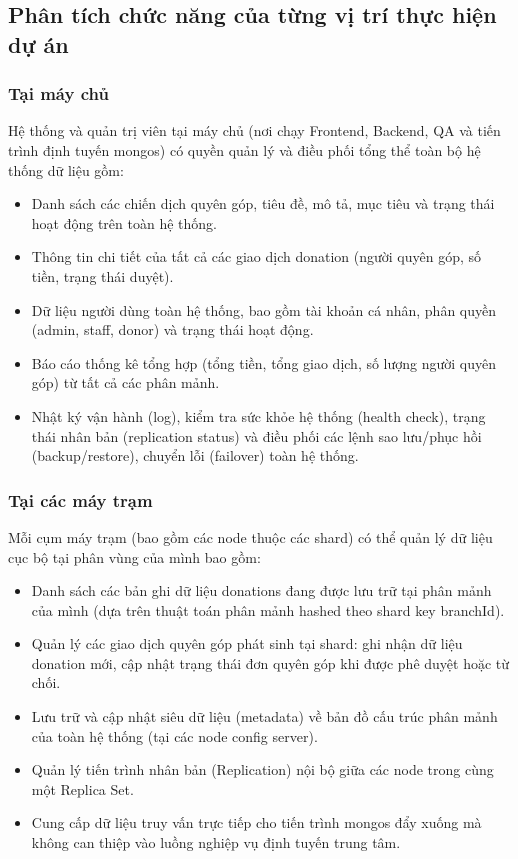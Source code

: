 \documentclass[12pt,a4paper]{article}
\begin{document}
\subsection{Phân tích chức năng của từng vị trí thực hiện dự án}

\subsubsection{Tại máy chủ}
Hệ thống và quản trị viên tại máy chủ (nơi chạy Frontend, Backend, QA và tiến trình định tuyến mongos) có quyền quản lý và điều phối tổng thể toàn bộ hệ thống dữ liệu gồm:
\begin{itemize}
    \item Danh sách các chiến dịch quyên góp, tiêu đề, mô tả, mục tiêu và trạng thái hoạt động trên toàn hệ thống.
    \item Thông tin chi tiết của tất cả các giao dịch donation (người quyên góp, số tiền, trạng thái duyệt).
    \item Dữ liệu người dùng toàn hệ thống, bao gồm tài khoản cá nhân, phân quyền (admin, staff, donor) và trạng thái hoạt động.
    \item Báo cáo thống kê tổng hợp (tổng tiền, tổng giao dịch, số lượng người quyên góp) từ tất cả các phân mảnh.
    \item Nhật ký vận hành (log), kiểm tra sức khỏe hệ thống (health check), trạng thái nhân bản (replication status) và điều phối các lệnh sao lưu/phục hồi (backup/restore), chuyển lỗi (failover) toàn hệ thống.
\end{itemize}

\subsubsection{Tại các máy trạm}
Mỗi cụm máy trạm (bao gồm các node thuộc các shard) có thể quản lý dữ liệu cục bộ tại phân vùng của mình bao gồm:
\begin{itemize}
    \item Danh sách các bản ghi dữ liệu donations đang được lưu trữ tại phân mảnh của mình (dựa trên thuật toán phân mảnh hashed theo shard key branchId).
    \item Quản lý các giao dịch quyên góp phát sinh tại shard: ghi nhận dữ liệu donation mới, cập nhật trạng thái đơn quyên góp khi được phê duyệt hoặc từ chối.
    \item Lưu trữ và cập nhật siêu dữ liệu (metadata) về bản đồ cấu trúc phân mảnh của toàn hệ thống (tại các node config server).
    \item Quản lý tiến trình nhân bản (Replication) nội bộ giữa các node trong cùng một Replica Set.
    \item Cung cấp dữ liệu truy vấn trực tiếp cho tiến trình mongos đẩy xuống mà không can thiệp vào luồng nghiệp vụ định tuyến trung tâm.
\end{itemize}
\end{document}
